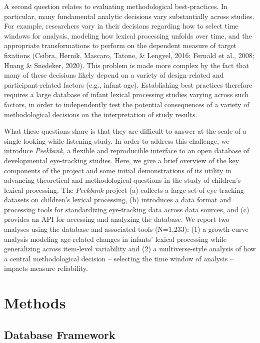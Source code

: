 \documentclass[10pt, letterpaper]{article}
\begin{document}
A second question relates to evaluating methodological best-practices.
In particular, many fundamental analytic decisions vary substantially
across studies. For example, researchers vary in their decisions
regarding how to select time windows for analysis, modeling how lexical
processing unfolds over time, and the appropriate transformations to
perform on the dependent measure of target fixations (Csibra, Hernik,
Mascaro, Tatone, \& Lengyel, 2016; Fernald et al., 2008; Huang \&
Snedeker, 2020). This problem is made more complex by the fact that many
of these decisions likely depend on a variety of design-related and
participant-related factors (e.g., infant age). Establishing best
practices therefore requires a large database of infant lexical
processing studies varying across such factors, in order to
independently test the potential consequences of a variety of
methodological decisions on the interpretation of study results.

What these questions share is that they are difficult to answer at the
scale of a single looking-while-listening study. In order to address
this challenge, we introduce \emph{Peekbank}, a flexible and
reproducible interface to an open database of developmental eye-tracking
studies. Here, we give a brief overview of the key components of the
project and some initial demonstrations of its utility in advancing
theoretical and methodological questions in the study of children's
lexical processing. The \emph{Peekbank} project (a) collects a large set
of eye-tracking datasets on children's lexical processing, (b)
introduces a data format and processing tools for standardizing
eye-tracking data across data sources, and (c) provides an API for
accessing and analyzing the database. We report two analyses using the
database and associated tools (N=1,233): (1) a growth-curve analysis
modeling age-related changes in infants' lexical processing while
generalizing across item-level variability and (2) a multiverse-style
analysis of how a central methodological decision -- selecting the time
window of analysis -- impacts measure reliability.

\hypertarget{methods}{%
\section{Methods}\label{methods}}

\hypertarget{database-framework}{%
\subsection{Database Framework}\label{database-framework}}
\end{document}
